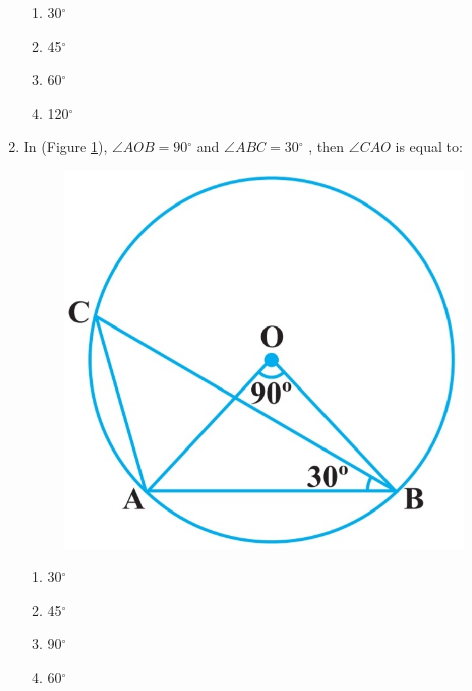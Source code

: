 \documentclass{article}
\begin{document}
\begin{enumerate}
\begin{enumerate}
\item 30$^{\circ}$
\item 45$^{\circ}$
\item 60$^{\circ}$
\item 120$^{\circ}$
\end{enumerate}
\item In (Figure \ref{fig:10.9}), $\angle$$AOB = 90$$^{\circ}$ and $\angle$$ABC = 30$$^{\circ}$ , then $\angle$$CAO$ is equal to:            \begin{figure}[H]
\centering
\includegraphics[width=\columnwidth]{figs/10.9.jpg}
\caption{}
\label{fig:10.9}
\end{figure}
\begin{enumerate}
\item 30$^{\circ}$
\item 45$^{\circ}$
\item 90$^{\circ}$
\item 60$^{\circ}$
\end{enumerate}
\end{enumerate}
\end{document}
